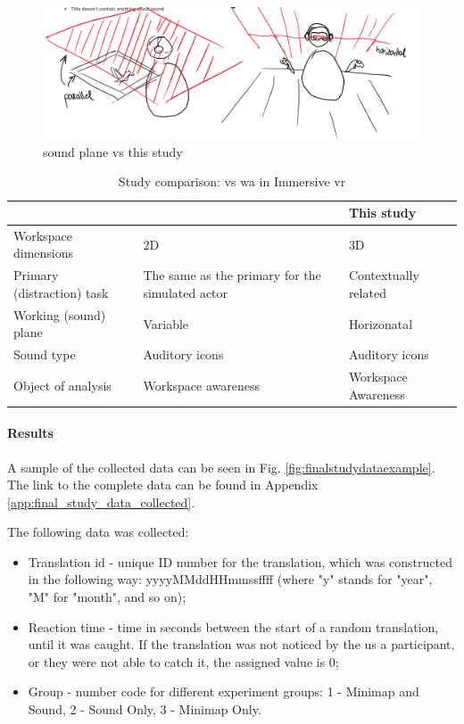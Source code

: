 \begin{figure}[h]
	\centering
	\includegraphics[width=0.7\linewidth]{figures/gutwin_vs_my_study_sound_plane}
	\caption{\cite{gutwin_chalk_2011} sound plane vs this study}
	\label{fig:gutwinvsmystudysoundplane}
\end{figure}


\begin{table}[]
  \caption{Study comparison: \cite{gutwin_chalk_2011} vs \gls{wa} in Immersive \gls{vr}}
  \label{table:study_comp}
  \begin{tabular}{|l|l|l|}
  \hline
                             & \cite{gutwin_chalk_2011}                & This study           \\ \hline
  Workspace dimensions				 & 2D									   & 3D \\ \hline
  Primary (distraction) task & The same as the primary for the simulated actor & Contextually related \\ \hline
  Working (sound) plane      & Variable             & Horizonatal          \\ \hline
  Sound type                 & Auditory icons        & Auditory icons       \\ \hline
  Object of analysis         & Workspace awareness   & Workspace Awareness  \\ \hline
  \end{tabular}
\end{table}

\paragraph{Results}
A sample of the collected data can be seen in Fig. \ref{fig:finalstudydataexample}. The link to the complete data can be found in Appendix \ref{app:final_study_data_collected}.

The following data was collected:
\begin{itemize}
	\item Translation id - unique ID number for the translation, which was constructed in the following way: yyyyMMddHHmmssffff (where "y" stands for "year", "M" for "month", and so on);
	\item Reaction time - time in seconds between the start of a random translation, until it was caught. If the translation was not noticed by the us a participant, or they were not able to catch it, the assigned value is 0;
	\item Group - number code for different experiment groups: 1 - Minimap and Sound, 2 - Sound Only, 3 - Minimap Only.
\end{itemize}

